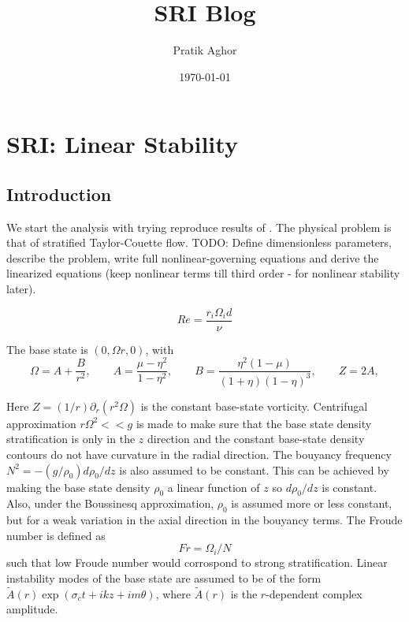 \documentclass{article}
\author{Pratik Aghor}
\title{SRI Blog}
\date{\today}  %
\begin{document}
\maketitle
\section*{SRI: Linear Stability}
\subsection*{Introduction}

We start the analysis with trying reproduce results of \cite{robins2020viscous}. The physical problem is that of stratified Taylor-Couette flow. 
TODO: Define dimensionless parameters, describe the problem, write full nonlinear-governing equations and derive the linearized equations (keep nonlinear terms till third order - for nonlinear stability later).

\begin{equation}\label{def:Re}
 Re = \frac{r_{i}\Omega_{i}d}{\nu}
\end{equation}

The base state is $(0, \Omega r, 0)$, with 
 \noindent
\begin{equation}
\Omega = A + \frac{B}{r^{2}},
\qquad
A = \frac{\mu - \eta^{2}}{1-\eta^{2}},
\qquad
B = \frac{\eta^{2}(1-\mu)}{(1+\eta)(1-\eta)^{3}},
\qquad
Z = 2A,
\label{eqn:base_state}
\end{equation}

Here $Z = (1/r) \partial_{r}(r^{2}\Omega)$ is the constant base-state vorticity. 
Centrifugal approximation $r\Omega^{2}<<g$ is made to make sure that the base state density stratification is only in the $z$ direction and the constant base-state density contours do not have curvature in the radial direction. The bouyancy frequency $N^{2} = -(g/\rho_{0})d\rho_{0}/dz$ is also assumed to be constant. This can be achieved by making the base state density $\rho_{0}$ a linear function of $z$ so $d\rho_{0}/dz$ is constant. Also, under the Boussinesq approximation, $\rho_{0}$ is assumed more or less constant, but for a weak variation in the axial direction in the bouyancy terms. The Froude number is defined as 
\begin{equation}\label{def:Fr}
 Fr = \Omega_{i}/N
\end{equation}
such that low Froude number would corrospond to strong stratification. Linear instability modes of the base state are assumed to be of the form  $\tilde{A}(r) \exp{(\sigma_{c}t + i k z + i m \theta)}$, where $\tilde{A}(r)$ is the $r$-dependent complex amplitude. 
\end{document}
